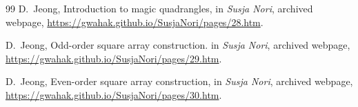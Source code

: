 \documentclass[11pt]{article}
\theoremstyle{plain}
\theoremstyle{definition}
\begin{document}
\begin{thebibliography}{99}
D.~Jeong,
Introduction to magic quadrangles,
in \textit{Susja Nori},
archived webpage,
\url{https://gwahak.github.io/SusjaNori/pages/28.htm}.


D.~Jeong,
Odd-order square array construction.
in \textit{Susja Nori},
archived webpage,
\url{https://gwahak.github.io/SusjaNori/pages/29.htm}.

D.~Jeong,
Even-order square array construction,
in \textit{Susja Nori},
archived webpage,
\url{https://gwahak.github.io/SusjaNori/pages/30.htm}.

\end{thebibliography}
\end{document}
